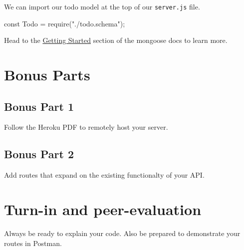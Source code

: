 \documentclass{42-en}
\begin{document}
				We can import our todo model at the top of our \texttt{server.js} file.
				\begin{42jscode}
					const Todo = require("./todo.schema");
				\end{42jscode}
				
				\newpage
				
				Head to the \href{https://mongoosejs.com/docs/index.html}{Getting Started} section of the mongoose docs to learn more.
				
					
					\newpage
					
					
\chapter{Bonus Parts}

\section{Bonus Part 1}
Follow the Heroku PDF to remotely host your server.

\section{Bonus Part 2}
Add routes that expand on the existing functionalty of your API.

\chapter{Turn-in and peer-evaluation}

Always be ready to explain your code. Also be prepared to demonstrate your routes in Postman.

\end{document}
